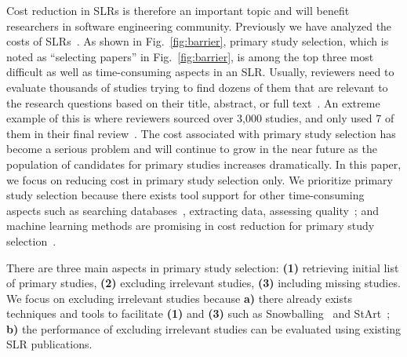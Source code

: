 \documentclass{svjour3}
\theoremstyle{break}
\begin{document}
Cost reduction in SLRs is therefore an important topic and will benefit researchers in software engineering community.
Previously we have analyzed the costs of SLRs~\cite{hassler2014outcomes,carver2013identifying}. As shown in Fig.~\ref{fig:barrier}, primary study selection, which is noted as ``selecting papers'' in Fig.~\ref{fig:barrier}, is among the top three most difficult
as well as time-consuming aspects in an SLR. Usually, reviewers need to evaluate
thousands of studies trying to find dozens of them that are relevant to the
research questions based on their title, abstract, or full text~\cite{bowes2012slurp}. An extreme
example of this is where reviewers sourced over
3,000 studies, and only used 7 of them in their final review~\cite{bezerra2009systematic}. The cost associated with primary study selection has become a serious problem and will continue to grow in the near future as the population of candidates for primary
studies increases dramatically. In this paper, we focus on reducing cost in primary study selection only. We prioritize primary study selection because there exists tool support for other time-consuming aspects such as searching databases~\cite{Molleri:2015:SWA:2745802.2745825,hernandes2012using}, extracting data\cite{Molleri:2015:SWA:2745802.2745825,hernandes2012using,fernandez2010slr,bowes2012slurp}, assessing quality~\cite{fernandez2010slr,bowes2012slurp,Molleri:2015:SWA:2745802.2745825}; and machine learning methods are promising in cost reduction for primary study selection~\cite{wallace2010semi,grossman2013}.

There are three main aspects in primary study selection: \textbf{(1)} retrieving initial list of primary studies, \textbf{(2)} excluding irrelevant studies, \textbf{(3)} including missing studies. We focus on excluding irrelevant studies because \textbf{a)} there already exists techniques and tools to facilitate \textbf{(1)} and \textbf{(3)} such as Snowballing~\cite{jalali2012systematic} and StArt~\cite{hernandes2012using}; \textbf{b)} the performance of excluding irrelevant studies can be evaluated using existing SLR publications.
\end{document}
